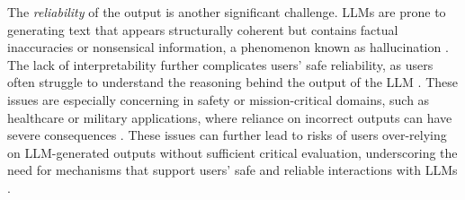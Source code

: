 {The \textit{reliability} of the output is another significant challenge. LLMs are prone to generating text that appears structurally coherent but contains factual inaccuracies or nonsensical information, a phenomenon known as hallucination \cite{rawte2023survey, bender2021dangers, ji2023survey, maynez2020faithfulness}. The lack of interpretability further complicates users' safe reliability, as users often struggle to understand the reasoning behind the output of the LLM \cite{mathews2019explainable, zhao2024explainability, yang2024harnessing, mirchandani2023large, liu2024we}. These issues are especially concerning in safety or mission-critical domains, such as healthcare or military applications, where reliance on incorrect outputs can have severe consequences \cite{koga2023exploring, lee2023benefits, sallam2023chatgpt}. These issues can further lead to risks of users over-relying on LLM-generated outputs without sufficient critical evaluation, underscoring the need for mechanisms that support users' safe and reliable interactions with LLMs \cite{ji2023survey, maynez2020faithfulness}. 
}

